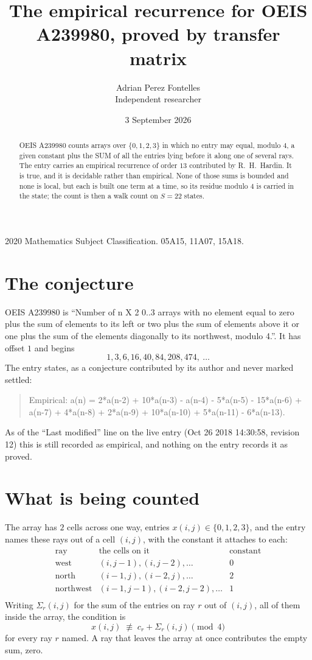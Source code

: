 \documentclass[11pt,a4paper]{article}
\title{The empirical recurrence for OEIS A239980, proved by transfer matrix}
\author{Adrian Perez Fontelles\\ \small Independent researcher}
\date{3 September 2026}
\theoremstyle{plain}
\theoremstyle{definition}
\begin{document}
\maketitle

\begin{abstract}
OEIS A239980 counts arrays over $\{0,1,2,3\}$ in which no entry may equal, modulo $4$, a given
constant plus the SUM of all the entries lying before it along one of several rays. The entry
carries an empirical recurrence of order $13$ contributed by R.~H.~Hardin. It is true, and
it is decidable rather than empirical. None of those sums is bounded and none is local, but
each is built one term at a time, so its residue modulo $4$ is carried in the state; the
count is then a walk count on $S=22$ states.
\end{abstract}

\noindent\small 2020 Mathematics Subject Classification. 05A15, 11A07, 15A18.\normalsize

\section{The conjecture}

OEIS A239980 is ``Number of n X 2 0..3 arrays with no element equal to zero plus the sum of elements to its left or two plus the sum of elements above it or one plus the sum of the elements diagonally to its northwest, modulo 4.''. It has offset $1$ and begins
\[
1, 3, 6, 16, 40, 84, 208, 474,\ \dots
\]
The entry states, as a conjecture contributed by its author and never marked settled:
\begin{quote}
Empirical: a(n) = 2*a(n-2) + 10*a(n-3) - a(n-4) - 5*a(n-5) - 15*a(n-6) + a(n-7) + 4*a(n-8) + 2*a(n-9) + 10*a(n-10) + 5*a(n-11) - 6*a(n-13).
\end{quote}
As of the ``Last modified'' line on the live entry (Oct 26 2018 14:30:58, revision 12) this is still
recorded as empirical, and nothing on the entry records it as proved.

\section{What is being counted}

The array has $2$ cells across one way, entries $x(i,j)\in\{0,1,2,3\}$, and the entry names these
rays out of a cell $(i,j)$, with the constant it attaches to each:
\[
\begin{array}{lll}
\text{ray} & \text{the cells on it} & \text{constant} \\[2pt]
\text{west} & (i,j-1),(i,j-2),\dots & 0 \\
\text{north} & (i-1,j),(i-2,j),\dots & 2 \\
\text{northwest} & (i-1,j-1),(i-2,j-2),\dots & 1 \\
\end{array}
\]
Writing $\Sigma_r(i,j)$ for the sum of the entries on ray $r$ out of $(i,j)$, all of them
inside the array, the condition is
\[
x(i,j)\;\not\equiv\;c_r+\Sigma_r(i,j) \pmod{4}
\]
for every ray $r$ named. A ray that leaves the array at once contributes the empty sum,
zero.
\end{document}
